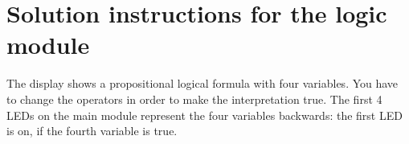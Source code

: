 \documentclass[a4paper, 12pt]{article}
\begin{document}
\section*{Solution instructions for the logic module}

The display shows a propositional logical formula with four variables. You have to change the operators in order to make the interpretation true. The first 4 LEDs on the main module represent the four variables backwards: the first LED is on, if the fourth variable is true.
\end{document}
